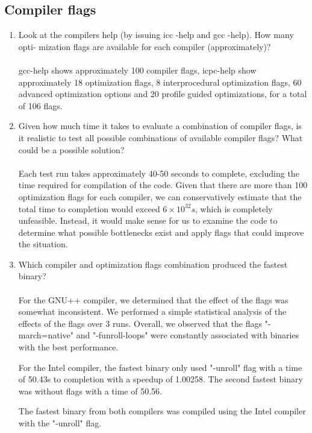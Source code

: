 \documentclass{article}
\begin{document}
\subsection{Compiler flags}
\begin{enumerate}
\item{Look at the compilers help (by issuing icc -help and gcc -help). How many opti-
mization flags are available for each compiler (approximately)?}\\\\
gcc-help shows approximately 100 compiler flags, icpc-help show approximately 18 optimization flags, 8 interprocedural optimization flags, 60 advanced optimization options and 20 profile guided optimizations, for a total of 106 flags.
\item{Given how much time it takes to evaluate a combination of compiler flags, is it realistic to test all possible combinations of available compiler flags? What could be a possible solution?}\\\\
 Each test run takes approximately 40-50 seconds to complete, excluding the time required for compilation of the code. Given that there are more than 100 optimization flags for each compiler, we can conservatively estimate that the total time to completion would exceed $6\times10^{32}s$, which is completely unfeasible. Instead, it would make sense for us to examine the code to determine what possible bottlenecks exist and apply flags that could improve the situation. 
\item{Which compiler and optimization flags combination produced the fastest binary?}\\\\
For the GNU++ compiler, we determined that the effect of the flags was somewhat inconsistent. We performed a simple statistical analysis of the effects of the flags over 3 runs. Overall, we observed that the flags "-march=native" and "-funroll-loops" were constantly associated with binaries with the best performance.

For the Intel compiler, the fastest binary only used "-unroll" flag with a time of 50.43s to completion with a speedup of 1.00258. The second fastest binary was without flags with a time of 50.56.

The fastest binary from both compilers was compiled using the Intel compiler with the "-unroll" flag.
\end{enumerate}
\end{document}
